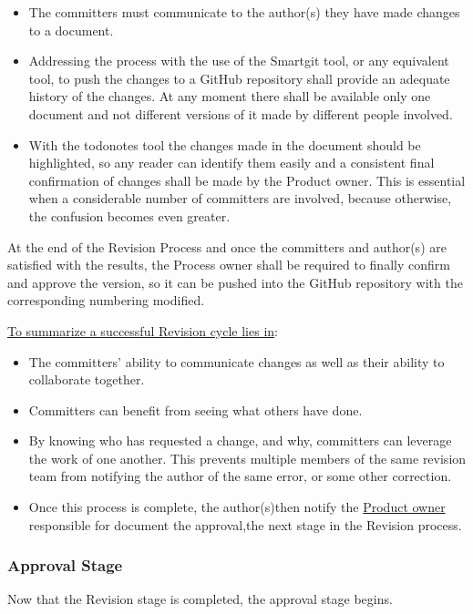 \documentclass{template/openetcs_article}
\begin{document}
\begin{itemize}
\item The committers must communicate to the author(s) they have made changes to a document. 
\item Addressing the process with the use of the Smartgit tool, or any equivalent tool, to push the changes to a GitHub repository shall provide an
adequate history of the changes. At any moment there shall be available only one document and not different versions of it made by different people involved.
\item With the todonotes tool the changes made in the document should be highlighted, so any reader can identify them easily and a consistent final confirmation of changes shall be made by the Product owner. This is essential when a considerable number of committers are involved, because otherwise, the confusion becomes even greater.
\end{itemize}

At the end of the Revision Process and once the committers and author(s) are satisfied with the results, the Process owner shall be required to finally confirm and approve the version, so it can be pushed into the GitHub repository with the corresponding numbering modified.

\underline{To summarize a successful Revision cycle lies in}:
\begin{itemize}
\item The committers’ ability to communicate changes as well as their ability to collaborate together. 
\item Committers can benefit from seeing what others have done.
\item By knowing who has requested a change, and why, committers can leverage the work of one another. This prevents multiple members of the same revision team from notifying the author of the same error, or some other correction.
\item Once this process is complete, the author(s)then notify the \underline{Product owner} responsible for document the approval,the next stage in the Revision process.
\end{itemize}

\subsubsection{Approval Stage}

Now that the Revision stage is completed, the approval stage begins. 
\end{document}
